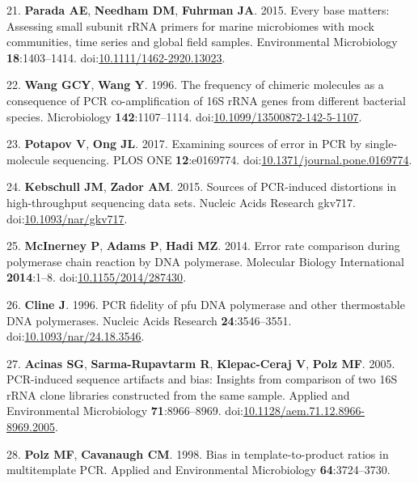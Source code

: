 \documentclass[11pt,]{article}
\begin{document}
\leavevmode\hypertarget{ref-Parada2015}{}%
21. \textbf{Parada AE}, \textbf{Needham DM}, \textbf{Fuhrman JA}. 2015.
Every base matters: Assessing small subunit rRNA primers for marine
microbiomes with mock communities, time series and global field samples.
Environmental Microbiology \textbf{18}:1403--1414.
doi:\href{https://doi.org/10.1111/1462-2920.13023}{10.1111/1462-2920.13023}.

\leavevmode\hypertarget{ref-Wang1996}{}%
22. \textbf{Wang GCY}, \textbf{Wang Y}. 1996. The frequency of chimeric
molecules as a consequence of PCR co-amplification of 16S rRNA genes
from different bacterial species. Microbiology \textbf{142}:1107--1114.
doi:\href{https://doi.org/10.1099/13500872-142-5-1107}{10.1099/13500872-142-5-1107}.

\leavevmode\hypertarget{ref-Potapov2017}{}%
23. \textbf{Potapov V}, \textbf{Ong JL}. 2017. Examining sources of
error in PCR by single-molecule sequencing. PLOS ONE
\textbf{12}:e0169774.
doi:\href{https://doi.org/10.1371/journal.pone.0169774}{10.1371/journal.pone.0169774}.

\leavevmode\hypertarget{ref-Kebschull2015}{}%
24. \textbf{Kebschull JM}, \textbf{Zador AM}. 2015. Sources of
PCR-induced distortions in high-throughput sequencing data sets. Nucleic
Acids Research gkv717.
doi:\href{https://doi.org/10.1093/nar/gkv717}{10.1093/nar/gkv717}.

\leavevmode\hypertarget{ref-McInerney2014}{}%
25. \textbf{McInerney P}, \textbf{Adams P}, \textbf{Hadi MZ}. 2014.
Error rate comparison during polymerase chain reaction by DNA
polymerase. Molecular Biology International \textbf{2014}:1--8.
doi:\href{https://doi.org/10.1155/2014/287430}{10.1155/2014/287430}.

\leavevmode\hypertarget{ref-Cline1996}{}%
26. \textbf{Cline J}. 1996. PCR fidelity of pfu DNA polymerase and other
thermostable DNA polymerases. Nucleic Acids Research
\textbf{24}:3546--3551.
doi:\href{https://doi.org/10.1093/nar/24.18.3546}{10.1093/nar/24.18.3546}.

\leavevmode\hypertarget{ref-Acinas2005}{}%
27. \textbf{Acinas SG}, \textbf{Sarma-Rupavtarm R}, \textbf{Klepac-Ceraj
V}, \textbf{Polz MF}. 2005. PCR-induced sequence artifacts and bias:
Insights from comparison of two 16S rRNA clone libraries constructed
from the same sample. Applied and Environmental Microbiology
\textbf{71}:8966--8969.
doi:\href{https://doi.org/10.1128/aem.71.12.8966-8969.2005}{10.1128/aem.71.12.8966-8969.2005}.

\leavevmode\hypertarget{ref-Polz1998}{}%
28. \textbf{Polz MF}, \textbf{Cavanaugh CM}. 1998. Bias in
template-to-product ratios in multitemplate PCR. Applied and
Environmental Microbiology \textbf{64}:3724--3730.
\end{document}

